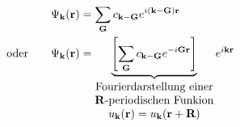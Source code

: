 \begin{itemize}
    \begin{align}
        \Psi_{\textbf{k}} (\textbf{r}) &= \sum_{\textbf{G}} c_{\textbf{k}-\textbf{G}} e^{i(\textbf{k}-\textbf{G}) \textbf{r}}\\
        \text{oder} \qquad \Psi_{\textbf{k}} (\textbf{r}) &= \underbrace{\left[\sum_{\textbf{G}} c_{\textbf{k}-\textbf{G}} e^{-i\textbf{G} \textbf{r}}\right]}_{
            \begin{matrix}
                \text{Fourierdarstellung einer} \\ \text{\textbf{R}-periodischen Funkion}\\
                u_{\textbf{k}} ( \textbf{r}) = u_{\textbf{k}} ( \textbf{r} + \textbf{R})
            \end{matrix}
        } e^{i \textbf{k} \textbf{r}}
    \end{align}
    

\end{itemize}
